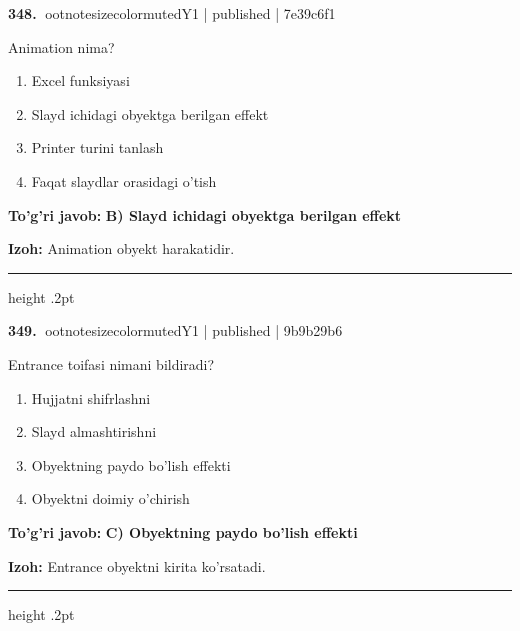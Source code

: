 \documentclass[10pt,a4paper]{article}
\begin{document}
\textbf{\color{ink}348.} {ootnotesizecolor{muted}Y1 | published | 7e39c6f1}
\par
Animation nima?
\begin{enumerate}[label=\Alph*),leftmargin=9mm]
\item Excel funksiyasi
\item Slayd ichidagi obyektga berilgan effekt
\item Printer turini tanlash
\item Faqat slaydlar orasidagi o'tish
\end{enumerate}
\begin{tcolorbox}[enhanced,breakable,colback=teal!4,colframe=teal!55!black,boxrule=0.45pt,arc=1.2mm,left=2.8mm,right=2.8mm,top=2mm,bottom=2mm]
\textbf{\color{teal}To'g'ri javob:} \textbf{B) Slayd ichidagi obyektga berilgan effekt}
\par\smallskip
\textbf{Izoh:} Animation obyekt harakatidir.
\end{tcolorbox}
\vspace{2mm}\hrule height .2pt\vspace{2mm}

\textbf{\color{ink}349.} {ootnotesizecolor{muted}Y1 | published | 9b9b29b6}
\par
Entrance toifasi nimani bildiradi?
\begin{enumerate}[label=\Alph*),leftmargin=9mm]
\item Hujjatni shifrlashni
\item Slayd almashtirishni
\item Obyektning paydo bo'lish effekti
\item Obyektni doimiy o'chirish
\end{enumerate}
\begin{tcolorbox}[enhanced,breakable,colback=teal!4,colframe=teal!55!black,boxrule=0.45pt,arc=1.2mm,left=2.8mm,right=2.8mm,top=2mm,bottom=2mm]
\textbf{\color{teal}To'g'ri javob:} \textbf{C) Obyektning paydo bo'lish effekti}
\par\smallskip
\textbf{Izoh:} Entrance obyektni kirita ko'rsatadi.
\end{tcolorbox}
\vspace{2mm}\hrule height .2pt\vspace{2mm}
\end{document}
